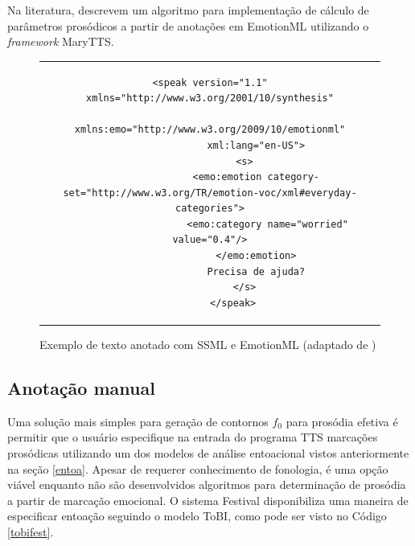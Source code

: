 Na literatura,  descrevem um algoritmo para implementação de
cálculo de parâmetros prosódicos a partir de anotações em EmotionML utilizando o
\emph{framework} MaryTTS.



\begin{figure}[thp]
    \centering
    \begin{tabular}{c}
        \begin{lstlisting}[label=lst:ssmlemotion]
        <speak version="1.1" xmlns="http://www.w3.org/2001/10/synthesis"
                xmlns:emo="http://www.w3.org/2009/10/emotionml"
                xml:lang="en-US">
            <s>
                <emo:emotion category-set="http://www.w3.org/TR/emotion-voc/xml#everyday-categories">
                    <emo:category name="worried" value="0.4"/>
                </emo:emotion>
                Precisa de ajuda?
            </s>
        </speak>
        \end{lstlisting}
    \end{tabular}
    \caption{Exemplo de texto anotado com SSML e EmotionML (adaptado de )}
\end{figure}


\subsection{Anotação manual}
Uma solução mais simples para geração de contornos $ f_0 $ para prosódia efetiva é
permitir que o usuário especifique na entrada do programa TTS marcações
prosódicas utilizando um dos modelos de análise entoacional vistos
anteriormente na seção \ref{entoa}. Apesar de requerer conhecimento de
fonologia, é uma opção viável enquanto não são desenvolvidos algoritmos para
determinação de prosódia a partir de marcação emocional. O sistema Festival
\cite{festival} disponibiliza uma maneira de especificar entoação seguindo o
modelo ToBI, como pode ser visto no Código \ref{tobifest}.

